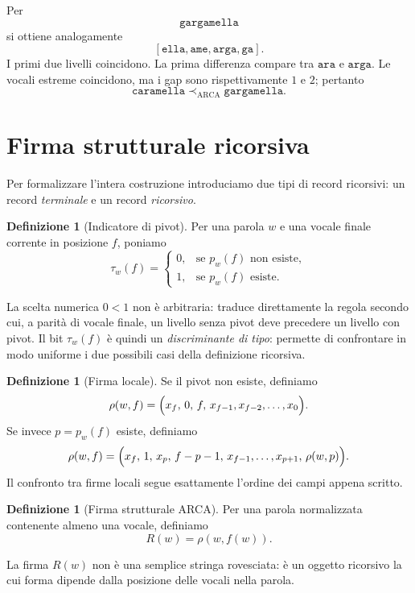 \documentclass[11pt,a4paper]{article}
\theoremstyle{definition}
\newtheorem{definizione}[teorema]{Definizione}
\theoremstyle{remark}
\newcommand{\ARCA}{\mathrm{ARCA}}
\newcommand{\precA}{\prec_{\ARCA}}
\newcommand{\Sig}{R}
\newcommand{\localSig}{\rho}
\newcommand{\Pivot}{p_w}
\newcommand{\Tag}{\tau_w}
\begin{document}
Per
\[
  \texttt{gargamella}
\]
si ottiene analogamente
\[
  [\texttt{ella},\texttt{ame},\texttt{arga},\texttt{ga}].
\]
I primi due livelli coincidono. La prima differenza compare tra $\texttt{ara}$ e $\texttt{arga}$. Le vocali estreme coincidono, ma i gap sono rispettivamente $1$ e $2$; pertanto
\[
  \texttt{caramella}\precA\texttt{gargamella}.
\]

\section{Firma strutturale ricorsiva}

Per formalizzare l'intera costruzione introduciamo due tipi di record ricorsivi: un record \emph{terminale} e un record \emph{ricorsivo}.

\begin{definizione}[Indicatore di pivot]
Per una parola $w$ e una vocale finale corrente in posizione $f$, poniamo
\[
  \Tag(f)=
  \begin{cases}
    0, & \text{se }\Pivot(f)\text{ non esiste},\\
    1, & \text{se }\Pivot(f)\text{ esiste}.
  \end{cases}
\]
\end{definizione}

La scelta numerica $0<1$ non è arbitraria: traduce direttamente la regola secondo cui, a parità di vocale finale, un livello senza pivot deve precedere un livello con pivot. Il bit $\Tag(f)$ è quindi un \emph{discriminante di tipo}: permette di confrontare in modo uniforme i due possibili casi della definizione ricorsiva.

\begin{definizione}[Firma locale]
Se il pivot non esiste, definiamo
\[
  \localSig(w,f)=
  \Bigl(
    x_f,\,0,\,f,\,x_{f-1},x_{f-2},\dots,x_0
  \Bigr).
\]
Se invece $p=\Pivot(f)$ esiste, definiamo
\[
  \localSig(w,f)=
  \Bigl(
    x_f,\,1,\,x_p,\,f-p-1,\,
    x_{f-1},\dots,x_{p+1},\,
    \localSig(w,p)
  \Bigr).
\]
Il confronto tra firme locali segue esattamente l'ordine dei campi appena scritto.
\end{definizione}

\begin{definizione}[Firma strutturale ARCA]
Per una parola normalizzata contenente almeno una vocale, definiamo
\[
  \Sig(w)=\localSig(w,f(w)).
\]
\end{definizione}

La firma $\Sig(w)$ non è una semplice stringa rovesciata: è un oggetto ricorsivo la cui forma dipende dalla posizione delle vocali nella parola.
\end{document}
